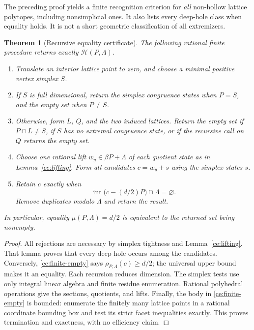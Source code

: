 \documentclass[11pt,a4paper]{article}
\newtheorem{theorem}{Theorem}[section]
\theoremstyle{remark}\newtheorem{remark}[theorem]{Remark}
\begin{document}
The preceding proof yields a finite recognition criterion for
\emph{all} non-hollow lattice polytopes, including nonsimplicial
ones. It also lists every deep-hole class when equality holds.
It is not a short geometric classification of all extremizers.

\begin{theorem}[Recursive equality certificate]\label{ce:algorithm}
The following rational finite procedure returns exactly
$\mathcal H(P,\Lambda)$.
\begin{enumerate}
\item Translate an interior lattice point to zero, and choose a
      minimal positive vertex simplex $S$.
\item If $S$ is full dimensional, return the simplex congruence
      states when $P=S$, and the empty set when $P\ne S$.
\item Otherwise, form $L$, $Q$, and the two induced lattices.
      Return the empty set if $P\cap L\ne S$, if $S$ has no
      extremal congruence state, or if the recursive call on $Q$
      returns the empty set.
\item Choose one rational lift $w_y\in\beta P+\Lambda$ of each
      quotient state as in Lemma~\ref{ce:lifting}. Form all
      candidates $c=w_y+s$ using the simplex states $s$.
\item Retain $c$ exactly when
      \begin{equation}\label{ce:finite-empty}
       \operatorname{int}\bigl(c-(d/2)P\bigr)\cap\Lambda
       =\varnothing.
      \end{equation}
      Remove duplicates modulo $\Lambda$ and return the result.
\end{enumerate}
In particular, equality $\mu(P,\Lambda)=d/2$ is equivalent to
the returned set being nonempty.
\end{theorem}
\begin{proof}
All rejections are necessary by simplex tightness and
Lemma~\ref{ce:lifting}. That lemma proves that every deep hole
occurs among the candidates. Conversely,
\eqref{ce:finite-empty} says $\rho_{P,\Lambda}(c)\ge d/2$;
the universal upper bound makes it an equality.
Each recursion reduces dimension. The simplex tests use only
integral linear algebra and finite residue enumeration. Rational
polyhedral operations give the sections, quotients, and lifts.
Finally, the body in \eqref{ce:finite-empty} is bounded: enumerate
the finitely many lattice points in a rational coordinate bounding
box and test its strict facet inequalities exactly. This proves
termination and exactness, with no efficiency claim.
\end{proof}
\end{document}
